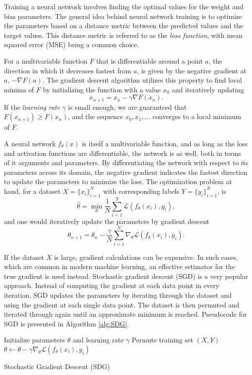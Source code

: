 \documentclass[../../thesis.tex]{subfiles}
\begin{document}
Training a neural network involves finding the optimal values for the weight and bias parameters. The general idea behind neural network training is to optimize the parameters based on a distance metric between the predicted values and the target values. This distance metric is referred to as the \textit{loss function}, with mean squared error (MSE) being a common choice.\newline

For a multivariable function $F$ that is differentiable around a point $a$, the direction in which it decreases fastest from $a$, is given by the negative gradient at $a$, $-\nabla F(a)$. The gradient descent algorithm utilizes this property to find local minima of $F$ by initializing the function with a value $x_0$ and iteratively updating 
\[
    x_{n+1} = x_{n} -\gamma \nabla F(x_{n}).
\] 
If the \textit{learning rate} $\gamma$ is small enough, we are guaranteed that $F(x_{n+1})\geq F(x_{n})$, and the sequence $x_0,x_1,\dots$ converges to a local minimum of $F$.\newline

A neural network $f_\theta(x)$ is itself a multivariable function, and as long as the loss and activation functions are differentiable, the network is as well, both in terms of it arguments and parameters. By differentiating the network with respect to its parameters across its domain, the negative gradient indicates the fastest direction to update the parameters to minimize the loss. The optimization problem at hand, for a dataset $X = \{x_i\}_{i=1}^N$ with corresponding labels $Y = \{y_i\}_{i=1}^N$, is
\[
   \widehat{\theta} = \min_{\theta} \frac{1}{N}\sum_{i=1}^N \mathcal{L}(f_\theta(x_i),y_i),
\]
and one would iteratively update the parameters by gradient descent 
\[
    \theta_{n+1} = \theta_{n} - \frac{\gamma}{N}\sum_{i=1}^N\nabla_\theta \mathcal{L}(f_\theta(x_i),y_i).
\]

If the dataset $X$ is large, gradient calculations can be expensive. In such cases, which are common in modern machine learning, an effective estimator for the true gradient is used instead. Stochastic gradient descent (SGD) is a very popular approach. Instead of computing the gradient at each data point in every iteration, SGD updates the parameters by iterating through the dataset and using the gradient at each single data point. The dataset is then permuted and iterated through again until an approximate minimum is reached. Pseudocode for SGD is presented in Algorithm \ref{alg:SDG}.

\begin{algorithm}
\begin{algorithmic}
    \State Initialize parameters $\theta$ and learning rate $\gamma$
        \State Permute training set $(X,Y)$
        \State $\theta \gets \theta - \gamma\nabla_\theta \mathcal{L}(f_\theta(x_i),y_i)$
    \EndFor
    \EndWhile
\end{algorithmic}
\caption{Stochastic Gradient Descent (SDG)}
\label{alg:SDG}
\end{algorithm}
\end{document}
